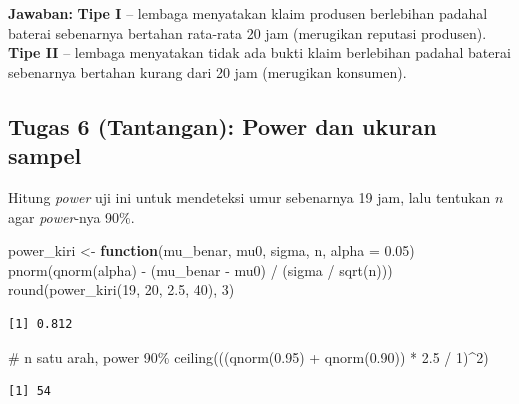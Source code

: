 \documentclass[
  indonesian,
  letterpaper,
]{book}
\newenvironment{Shaded}{\begin{snugshade}}{\end{snugshade}}
\newcommand{\AttributeTok}[1]{\textcolor[rgb]{0.40,0.45,0.13}{#1}}
\newcommand{\CommentTok}[1]{\textcolor[rgb]{0.37,0.37,0.37}{#1}}
\newcommand{\ControlFlowTok}[1]{\textcolor[rgb]{0.00,0.23,0.31}{\textbf{#1}}}
\newcommand{\DecValTok}[1]{\textcolor[rgb]{0.68,0.00,0.00}{#1}}
\newcommand{\FloatTok}[1]{\textcolor[rgb]{0.68,0.00,0.00}{#1}}
\newcommand{\FunctionTok}[1]{\textcolor[rgb]{0.28,0.35,0.67}{#1}}
\newcommand{\NormalTok}[1]{\textcolor[rgb]{0.00,0.23,0.31}{#1}}
\newcommand{\OtherTok}[1]{\textcolor[rgb]{0.00,0.23,0.31}{#1}}
\newcommand{\SpecialCharTok}[1]{\textcolor[rgb]{0.37,0.37,0.37}{#1}}
\begin{document}
\textbf{Jawaban:} \textbf{Tipe I} -- lembaga menyatakan klaim produsen
berlebihan padahal baterai sebenarnya bertahan rata-rata 20 jam
(merugikan reputasi produsen). \textbf{Tipe II} -- lembaga menyatakan
tidak ada bukti klaim berlebihan padahal baterai sebenarnya bertahan
kurang dari 20 jam (merugikan konsumen).

\subsection{Tugas 6 (Tantangan): Power dan ukuran
sampel}\label{tugas-6-tantangan-power-dan-ukuran-sampel}

Hitung \emph{power} uji ini untuk mendeteksi umur sebenarnya 19 jam,
lalu tentukan \(n\) agar \emph{power}-nya 90\%.

\begin{Shaded}
\begin{Highlighting}[]
\NormalTok{power\_kiri }\OtherTok{\textless{}{-}} \ControlFlowTok{function}\NormalTok{(mu\_benar, mu0, sigma, n, }\AttributeTok{alpha =} \FloatTok{0.05}\NormalTok{)}
  \FunctionTok{pnorm}\NormalTok{(}\FunctionTok{qnorm}\NormalTok{(alpha) }\SpecialCharTok{{-}}\NormalTok{ (mu\_benar }\SpecialCharTok{{-}}\NormalTok{ mu0) }\SpecialCharTok{/}\NormalTok{ (sigma }\SpecialCharTok{/} \FunctionTok{sqrt}\NormalTok{(n)))}
\FunctionTok{round}\NormalTok{(}\FunctionTok{power\_kiri}\NormalTok{(}\DecValTok{19}\NormalTok{, }\DecValTok{20}\NormalTok{, }\FloatTok{2.5}\NormalTok{, }\DecValTok{40}\NormalTok{), }\DecValTok{3}\NormalTok{)}
\end{Highlighting}
\end{Shaded}

\begin{verbatim}
[1] 0.812
\end{verbatim}

\begin{Shaded}
\begin{Highlighting}[]
\CommentTok{\# n satu arah, power 90\%}
\FunctionTok{ceiling}\NormalTok{(((}\FunctionTok{qnorm}\NormalTok{(}\FloatTok{0.95}\NormalTok{) }\SpecialCharTok{+} \FunctionTok{qnorm}\NormalTok{(}\FloatTok{0.90}\NormalTok{)) }\SpecialCharTok{*} \FloatTok{2.5} \SpecialCharTok{/} \DecValTok{1}\NormalTok{)}\SpecialCharTok{\^{}}\DecValTok{2}\NormalTok{)}
\end{Highlighting}
\end{Shaded}

\begin{verbatim}
[1] 54
\end{verbatim}
\end{document}
